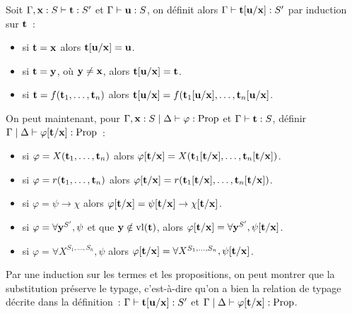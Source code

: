 \documentclass{article}
\begin{document}
\begin{defi}
    Soit $\Gamma, \mathbf{x} : S\vdash \mathbf{t} : S'$ et $\Gamma\vdash \mathbf{u} : S$, on définit alors $\Gamma\vdash \mathbf{t}[\mathbf{u}/\mathbf{x}] : S'$ par induction sur $\mathbf{t}$~:
    \begin{itemize}
        \item si $\mathbf{t} = \mathbf{x}$ alors $\mathbf{t}[\mathbf{u}/\mathbf{x}] = \mathbf{u}$.
        \item si $\mathbf{t} = \mathbf{y}$, où $\mathbf{y} \neq \mathbf{x}$, alors $\mathbf{t}[\mathbf{u}/\mathbf{x}] = \mathbf{t}$.
        \item si $\mathbf{t} = f(\mathbf{t}_1,\ldots,\mathbf{t}_n)$ alors $\mathbf{t}[\mathbf{u}/\mathbf{x}] = f(\mathbf{t}_1[\mathbf{u}/\mathbf{x}],\ldots,\mathbf{t}_n[\mathbf{u}/\mathbf{x}]$.
    \end{itemize}
    On peut maintenant, pour $\Gamma, \mathbf{x} : S\mid\Delta\vdash \varphi : \mathrm{Prop}$ et $\Gamma\vdash \mathbf{t} : S$, définir $\Gamma\mid\Delta\vdash\varphi[\mathbf{t}/\mathbf{x}] : \mathrm{Prop}$~:
    \begin{itemize}
        \item si $\varphi = X(\mathbf{t}_1,\ldots,\mathbf{t}_n)$ alors $\varphi[\mathbf{t}/\mathbf{x}] = X(\mathbf{t}_1[\mathbf{t}/\mathbf{x}],\ldots,\mathbf{t}_n[\mathbf{t}/\mathbf{x}])$.
        \item si $\varphi = r(\mathbf{t}_1,\ldots,\mathbf{t}_n)$ alors $\varphi[\mathbf{t}/\mathbf{x}] = r(\mathbf{t}_1[\mathbf{t}/\mathbf{x}],\ldots,\mathbf{t}_n[\mathbf{t}/\mathbf{x}])$.
        \item si $\varphi = \psi \to \chi$ alors $\varphi[\mathbf{t}/\mathbf{x}] = \psi[\mathbf{t}/\mathbf{x}] \to \chi[\mathbf{t}/\mathbf{x}]$.
        \item si $\varphi = \forall \mathbf{y}^{S'}, \psi$ et que $\mathbf{y}\notin \mathrm{vl}(\mathbf{t})$, alors $\varphi[\mathbf{t}/\mathbf{x}] = \forall \mathbf{y}^{S'}, \psi[\mathbf{t}/\mathbf{x}]$.
        \item si $\varphi = \forall X^{S_1,\ldots,S_n}, \psi$ alors $\varphi[\mathbf{t}/\mathbf{x}] = \forall X^{S_1,\ldots,S_n}, \psi[\mathbf{t}/\mathbf{x}]$.
    \end{itemize}
\end{defi}

Par une induction sur les termes et les propositions, on peut montrer que la substitution préserve le typage, c'est-à-dire qu'on a bien la relation de typage décrite dans la définition~: $\Gamma\vdash \mathbf{t}[\mathbf{u}/\mathbf{x}] : S'$ et $\Gamma\mid\Delta\vdash \varphi[\mathbf{t}/\mathbf{x}] : \mathrm{Prop}$.
\end{document}
